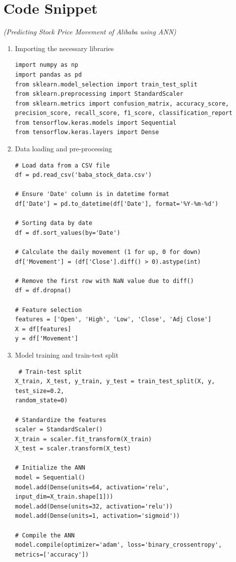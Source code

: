 \documentclass[12pt,a4paper]{report}
\begin{document}
\section{Code Snippet} \textit{(Predicting Stock Price Movement of Alibaba using ANN)}
\begin{enumerate}
        \item Importing the necessary libraries
        \begin{verbatim}
import numpy as np
import pandas as pd
from sklearn.model_selection import train_test_split
from sklearn.preprocessing import StandardScaler
from sklearn.metrics import confusion_matrix, accuracy_score, 
precision_score, recall_score, f1_score, classification_report
from tensorflow.keras.models import Sequential
from tensorflow.keras.layers import Dense
       \end{verbatim}
       \item Data loading and pre-processing 
       \begin{verbatim}
# Load data from a CSV file
df = pd.read_csv('baba_stock_data.csv')

# Ensure 'Date' column is in datetime format
df['Date'] = pd.to_datetime(df['Date'], format='%Y-%m-%d')

# Sorting data by date
df = df.sort_values(by='Date')

# Calculate the daily movement (1 for up, 0 for down)
df['Movement'] = (df['Close'].diff() > 0).astype(int)

# Remove the first row with NaN value due to diff()
df = df.dropna()

# Feature selection
features = ['Open', 'High', 'Low', 'Close', 'Adj Close']
X = df[features]
y = df['Movement']
     \end{verbatim}
     \item Model training and train-test split 
     \begin{verbatim}
 # Train-test split
X_train, X_test, y_train, y_test = train_test_split(X, y, test_size=0.2,
random_state=0)

# Standardize the features
scaler = StandardScaler()
X_train = scaler.fit_transform(X_train)
X_test = scaler.transform(X_test)

# Initialize the ANN
model = Sequential()
model.add(Dense(units=64, activation='relu', input_dim=X_train.shape[1]))
model.add(Dense(units=32, activation='relu'))
model.add(Dense(units=1, activation='sigmoid'))

# Compile the ANN
model.compile(optimizer='adam', loss='binary_crossentropy', 
metrics=['accuracy'])


\end{verbatim}
\end{enumerate}
\end{document}
